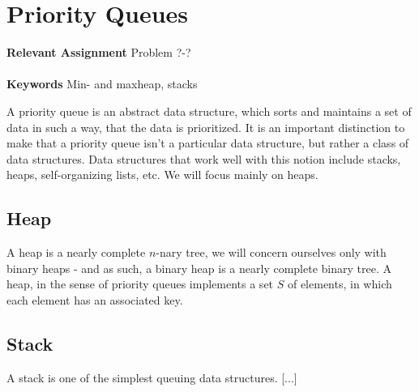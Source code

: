 
\chapter{Priority Queues}
\label{ch:priorityqueues}

\textbf{Relevant Assignment} Problem ?-?\\\\
\textbf{Keywords} Min- and maxheap, stacks
\vspace{1in}

\noindent A priority queue is an abstract data structure, which sorts and
maintains a set of data in such a way, that the data is prioritized. It is an
important distinction to make that a priority queue isn't a particular data
structure, but rather a class of data structures. Data structures that work
well with this notion include stacks, heaps, self-organizing lists, etc.
We will focus mainly on heaps.

\section{Heap}
A heap is a nearly complete $n$-nary tree, we will concern ourselves only with
binary heaps - and as such, a binary heap is a nearly complete binary tree. A
heap, in the sense of priority queues implements a set $S$ of elements, in
which each element has an associated key.

\section{Stack}
A stack is one of the simplest queuing data structures. [...]

